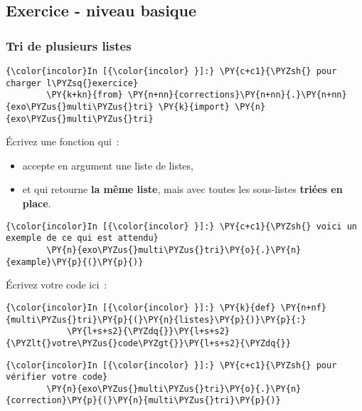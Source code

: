     \hypertarget{exercice---niveau-basique}{%
\subsection{Exercice - niveau basique}\label{exercice---niveau-basique}}

    \hypertarget{tri-de-plusieurs-listes}{%
\subsubsection{Tri de plusieurs listes}\label{tri-de-plusieurs-listes}}

    \begin{Verbatim}[commandchars=\\\{\}]
{\color{incolor}In [{\color{incolor} }]:} \PY{c+c1}{\PYZsh{} pour charger l\PYZsq{}exercice}
        \PY{k+kn}{from} \PY{n+nn}{corrections}\PY{n+nn}{.}\PY{n+nn}{exo\PYZus{}multi\PYZus{}tri} \PY{k}{import} \PY{n}{exo\PYZus{}multi\PYZus{}tri}
\end{Verbatim}


    Écrivez une fonction qui~:
    
\begin{itemize}
	\item 
	accepte en argument une liste de listes,
	\item
	et qui retourne \textbf{la même liste}, mais avec toutes les sous-listes
	\textbf{triées en place}.
\end{itemize}

    \begin{Verbatim}[commandchars=\\\{\}]
{\color{incolor}In [{\color{incolor} }]:} \PY{c+c1}{\PYZsh{} voici un exemple de ce qui est attendu}
        \PY{n}{exo\PYZus{}multi\PYZus{}tri}\PY{o}{.}\PY{n}{example}\PY{p}{(}\PY{p}{)}
\end{Verbatim}


    Écrivez votre code ici~:

    \begin{Verbatim}[commandchars=\\\{\}]
{\color{incolor}In [{\color{incolor} }]:} \PY{k}{def} \PY{n+nf}{multi\PYZus{}tri}\PY{p}{(}\PY{n}{listes}\PY{p}{)}\PY{p}{:} 
            \PY{l+s+s2}{\PYZdq{}}\PY{l+s+s2}{\PYZlt{}votre\PYZus{}code\PYZgt{}}\PY{l+s+s2}{\PYZdq{}}
\end{Verbatim}


    \begin{Verbatim}[commandchars=\\\{\}]
{\color{incolor}In [{\color{incolor} }]:} \PY{c+c1}{\PYZsh{} pour vérifier votre code}
        \PY{n}{exo\PYZus{}multi\PYZus{}tri}\PY{o}{.}\PY{n}{correction}\PY{p}{(}\PY{n}{multi\PYZus{}tri}\PY{p}{)}
\end{Verbatim}


